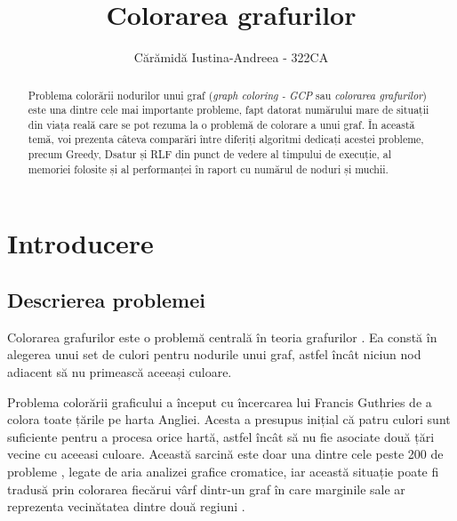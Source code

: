 \documentclass[runningheads]{llncs}
\begin{document}
%
\title{Colorarea grafurilor}
%
\author{Cărămidă Iustina-Andreea - 322CA}
%
%
\maketitle              %
%
\begin{abstract}
    Problema colorării nodurilor unui graf (\textit{graph coloring - GCP} sau \textit{colorarea grafurilor})
    este una dintre cele mai importante probleme, fapt datorat numărului mare de situații din viața reală
    care se pot rezuma la o problemă de colorare a unui graf. În această temă, voi prezenta câteva comparări 
    între diferiți algoritmi dedicați acestei probleme, precum Greedy, Dsatur și RLF din 
    punct de vedere al timpului de execuție, al memoriei folosite și al performanței în raport cu numărul 
    de noduri și muchii.


\end{abstract}


\section{Introducere}
\subsection{Descrierea problemei}

\quad Colorarea grafurilor este o problemă centrală în teoria grafurilor \cite{1}. Ea 
constă în alegerea unui set de culori pentru nodurile unui graf, astfel încât 
niciun nod adiacent să nu primească aceeași culoare.

Problema colorării graficului a început cu încercarea lui 
Francis Guthries de a colora toate țările pe harta Angliei. 
Acesta a presupus inițial că patru culori sunt suficiente pentru a procesa orice 
hartă, astfel încât să nu fie asociate două țări vecine
cu aceeasi culoare. Această sarcină este doar una dintre cele peste 200 de probleme
\cite{2}, legate de aria analizei grafice cromatice,
iar această situație poate fi tradusă prin colorarea fiecărui vârf
dintr-un graf în care marginile sale ar reprezenta vecinătatea
dintre două regiuni \cite{3}.
\end{document}
